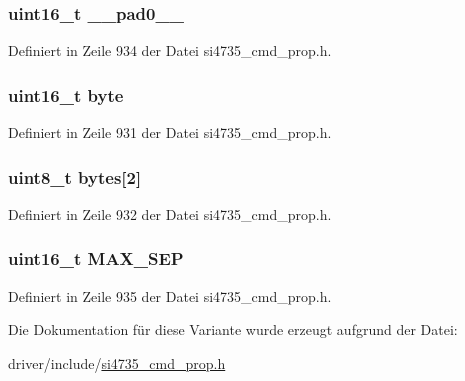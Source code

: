 \subsubsection[{\+\_\+\+\_\+pad0\+\_\+\+\_\+}]{\setlength{\rightskip}{0pt plus 5cm}uint16\+\_\+t \+\_\+\+\_\+pad0\+\_\+\+\_\+}\label{unionfm__blend__max__stereo__sepa_a77132c2c26a75f5b8751b235cda23828}


Definiert in Zeile 934 der Datei si4735\+\_\+cmd\+\_\+prop.\+h.

\hypertarget{unionfm__blend__max__stereo__sepa_ab0549c1b5ea980a02e7eab77e21fea49}{}
\subsubsection[{byte}]{\setlength{\rightskip}{0pt plus 5cm}uint16\+\_\+t byte}\label{unionfm__blend__max__stereo__sepa_ab0549c1b5ea980a02e7eab77e21fea49}


Definiert in Zeile 931 der Datei si4735\+\_\+cmd\+\_\+prop.\+h.

\hypertarget{unionfm__blend__max__stereo__sepa_a46e4c05d20a047ec169f60d3167e912e}{}
\subsubsection[{bytes}]{\setlength{\rightskip}{0pt plus 5cm}uint8\+\_\+t bytes\mbox{[}2\mbox{]}}\label{unionfm__blend__max__stereo__sepa_a46e4c05d20a047ec169f60d3167e912e}


Definiert in Zeile 932 der Datei si4735\+\_\+cmd\+\_\+prop.\+h.

\hypertarget{unionfm__blend__max__stereo__sepa_aa66d0206353a48c2ce247b9951607855}{}
\subsubsection[{M\+A\+X\+\_\+\+S\+E\+P}]{\setlength{\rightskip}{0pt plus 5cm}uint16\+\_\+t M\+A\+X\+\_\+\+S\+E\+P}\label{unionfm__blend__max__stereo__sepa_aa66d0206353a48c2ce247b9951607855}


Definiert in Zeile 935 der Datei si4735\+\_\+cmd\+\_\+prop.\+h.



Die Dokumentation für diese Variante wurde erzeugt aufgrund der Datei\+:\begin{DoxyCompactItemize}
\item 
driver/include/\hyperlink{si4735__cmd__prop_8h}{si4735\+\_\+cmd\+\_\+prop.\+h}\end{DoxyCompactItemize}
